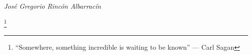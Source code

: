 \documentclass[]{friggeri-cv}
\begin{document}
\begin{flushright}
\emph{\large{\\ José Gregorio Rincón Albarracín}}

\end{flushright}

\let\thefootnote\relax\footnote{\enquote{Somewhere, something incredible is waiting to be known} --- Carl Sagan}
\end{document}
